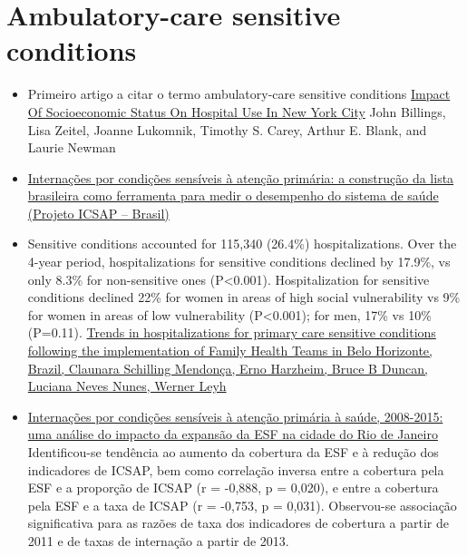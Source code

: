 \documentclass[]{book}
\begin{document}
\hypertarget{ambulatory-care-sensitive-conditions}{%
\section*{Ambulatory-care sensitive conditions}\label{ambulatory-care-sensitive-conditions}}

\begin{itemize}
\item
  Primeiro artigo a citar o termo ambulatory-care sensitive conditions \href{https://www.healthaffairs.org/doi/pdf/10.1377/hlthaff.12.1.162}{Impact Of Socioeconomic Status On Hospital Use In New York City} John Billings, Lisa Zeitel, Joanne Lukomnik, Timothy S. Carey, Arthur E. Blank, and Laurie Newman
\item
  \href{http://www.scielo.br/pdf/csp/v25n6/16.pdf}{Internações por condições sensíveis à atenção primária: a construção da lista brasileira como ferramenta para medir o desempenho do sistema de saúde (Projeto ICSAP -- Brasil)}
\item
  Sensitive conditions accounted for 115,340 (26.4\%) hospitalizations. Over the 4-year period, hospitalizations for sensitive conditions declined by 17.9\%, vs only 8.3\% for non-sensitive ones (P\textless{}0.001). Hospitalization for sensitive conditions declined 22\% for women in areas of high social vulnerability vs 9\% for women in areas of low vulnerability (P\textless{}0.001); for men, 17\% vs 10\% (P=0.11). \href{https://academic.oup.com/heapol/article/27/4/348/605470}{Trends in hospitalizations for primary care sensitive conditions following the implementation of Family Health Teams in Belo Horizonte, Brazil, Claunara Schilling Mendonça, Erno Harzheim, Bruce B Duncan, Luciana Neves Nunes, Werner Leyh}
\item
  \href{http://www.scielo.br/scielo.php?script=sci_arttext\&pid=S1414-462X2018000200178\&lng=pt\&nrm=iso\&tlng=pt}{Internações por condições sensíveis à atenção primária à saúde, 2008-2015: uma análise do impacto da expansão da ESF na cidade do Rio de Janeiro}\\
  Identificou-se tendência ao aumento da cobertura da ESF e à redução dos indicadores de ICSAP, bem como correlação inversa entre a cobertura pela ESF e a proporção de ICSAP (r = -0,888, p = 0,020), e entre a cobertura pela ESF e a taxa de ICSAP (r = -0,753, p = 0,031). Observou-se associação significativa para as razões de taxa dos indicadores de cobertura a partir de 2011 e de taxas de internação a partir de 2013.\\

\end{itemize}
\end{document}
